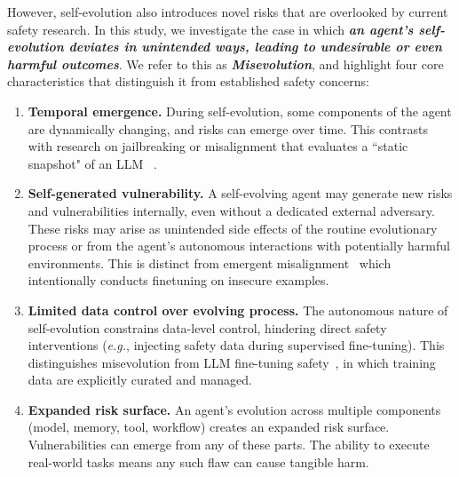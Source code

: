 \documentclass{article} %
\begin{document}
However, self-evolution also introduces novel risks that are overlooked by current safety research. 
In this study, we investigate the case in which \textbf{\textit{an agent's self-evolution deviates in unintended ways, leading to undesirable or even harmful outcomes}}. We refer to this as \textit{\textbf{Misevolution}}, and highlight four core characteristics that distinguish it from established safety concerns:
\begin{enumerate}[left=0.3cm]
\item \textbf{Temporal emergence.} During self-evolution, some components of the agent are dynamically changing, and risks can emerge over time.  
This contrasts with research on jailbreaking or misalignment that evaluates a ``static snapshot" of an LLM ~\citep{chao2024jailbreakingblackboxlarge, li2023multistepjailbreakingprivacyattacks}.
\item \textbf{Self-generated vulnerability.} A self-evolving agent may generate new risks and vulnerabilities internally, even without a dedicated external adversary. These risks may arise as unintended side effects of the routine evolutionary process or from the agent's autonomous interactions with potentially harmful environments. This is distinct from emergent misalignment~\citep{betley2025emergent} which intentionally conducts finetuning on insecure examples.
\item \textbf{Limited data control over evolving process.} The autonomous nature of self-evolution constrains data-level control, hindering direct safety interventions (\textit{e.g.}, injecting safety data during supervised fine-tuning). This distinguishes misevolution from LLM fine-tuning safety~\citep{qi2024finetuning}, in which training data are explicitly curated and managed.
\item \textbf{Expanded risk surface.} An agent's evolution across multiple components (model, memory, tool, workflow) creates an expanded risk surface. Vulnerabilities can emerge from any of these parts. The ability to execute real-world tasks means any such flaw can cause tangible harm.
\end{enumerate}
\end{document}
